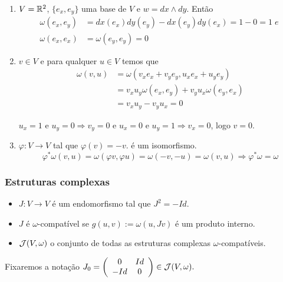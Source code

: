\documentclass{beamer}
\begin{document}
	\begin{frame}
		\begin{exemplo}
			\begin{enumerate}
				\item $V = \mathbb{R}^{2}$, $\{e_{x}, e_{y}\}$ uma base de $V$ e $w=dx \wedge dy$. Então 
				$$
				\begin{aligned}
					\omega(e_{x}, e_{y}) &=dx(e_{x}) dy(e_{y}) - dx(e_{y}) dy(e_{x}) = 1-0= 1 \; e\; 
					\\
					\omega(e_{x}, e_{x}) &= \omega(e_{y}, e_{y}) = 0	
				\end{aligned}
				$$ 
				
				\item $v \in V$ e para qualquer $u \in V$ temos que 
				$$
				\begin{aligned}
					\omega(v, u) &= \omega(v_{x}e_{x}+v_{y}e_{y}, u_{x}e_{x}+u_{y}e_{y})
					\\
					&=
					v_{x}u_{y}\omega(e_{x}, e_{y}) +v_{y}u_{x}\omega(e_{y}, e_{x})
					\\
					&= v_{x}u_{y} -v_{y}u_{x} = 0
				\end{aligned}
				$$
				
				$u_{x} = 1$ e $u_{y} = 0 \Rightarrow v_{y} = 0$ e $u_{x} = 0$ e $u_{y} = 1 \Rightarrow v_{x} = 0$, logo $v=0$.
				
				\item $\varphi:V \to V$ tal que $\varphi(v) = -v$. é um isomorfismo. 
				$$
				\varphi^{*}\omega(v, u) = \omega(\varphi v, \varphi u)=\omega(-v, -u)=\omega(v, u) \Rightarrow \varphi^{*}\omega = \omega$$
			\end{enumerate}			
		\end{exemplo}
	\end{frame}
	
	\begin{frame}
		\frametitle{Estruturas complexas}
		
		\begin{definicao}
			\begin{itemize}
				\item $J: V \to V$ é um endomorfismo tal que $J^{2} = -Id$. 
				
				\item $J$ é $\omega$-compatível se $g(u,v):=\omega(u, Jv)$ é um produto interno. 
				
				\item $\mathcal{J}(V, \omega)$ o conjunto de todas as estruturas complexas $\omega$-compatíveis.
				
			\end{itemize}
		\end{definicao}
		Fixaremos a notação
			$
			J_{0}=
			\left(
			\begin{array}{cc}
			0 & Id
			\\
			-Id & 0
			\end{array}
			\right) \in \mathcal{J}(V, \omega) .
			$
	\end{frame}
	
\end{document}
